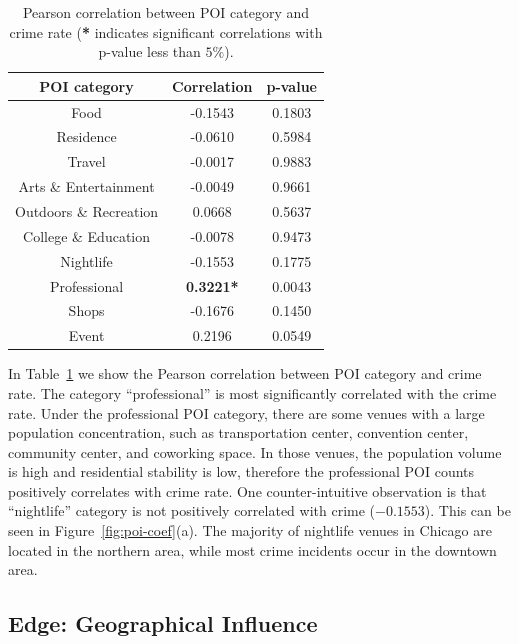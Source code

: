 \begin{table}[h]
\centering
\caption{Pearson correlation between POI category and crime rate (\textbf{*} indicates significant correlations with p-value less than $5\%$).}
\vspace{2mm}

\label{tb:poi-corr}
\begin{tabular}{|c ||c|c|}
\hline
POI category & Correlation & p-value \\ \hline \hline
Food & -0.1543 &  0.1803 \\ \hline
Residence &  -0.0610 &  0.5984 \\ \hline
Travel & -0.0017 &  0.9883 \\ \hline
Arts \& Entertainment & -0.0049 &  0.9661 \\ \hline
Outdoors \& Recreation &  0.0668 &  0.5637 \\ \hline
College \& Education & -0.0078 &  0.9473 \\ \hline
Nightlife &  -0.1553 &  0.1775 \\ \hline
Professional & \textbf{0.3221*} &  0.0043 \\ \hline
Shops & -0.1676 &  0.1450 \\ \hline
Event & 0.2196 &  0.0549  \\ \hline
\end{tabular}
\end{table}



In Table~\ref{tb:poi-corr} we show the Pearson correlation between POI category and crime rate. The category ``professional''  is most significantly correlated with the crime rate. Under the professional POI category, there are some venues with a large population concentration, such as transportation center, convention center, community center, and coworking space. In those venues, the  population volume is high and residential stability is low, therefore the professional POI counts positively correlates with crime rate.  One counter-intuitive observation is that ``nightlife'' category is not positively correlated with crime ($-0.1553$). This can be seen in Figure~\ref{fig:poi-coef}(a). The majority of nightlife venues in Chicago are located in the northern area, while most crime incidents occur in the downtown area.



\subsection{Edge: Geographical Influence}

